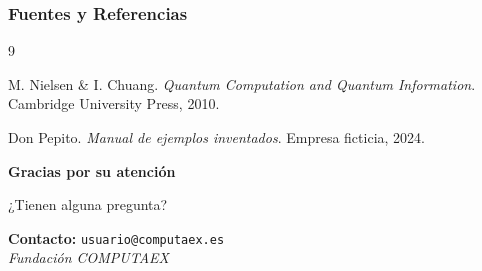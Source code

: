 \documentclass[aspectratio=169]{beamer} %
\begin{document}
\begin{frame}[allowframebreaks] %
\frametitle{Fuentes y Referencias}
\begin{thebibliography}{9}

    M. Nielsen \& I. Chuang.
    \textit{Quantum Computation and Quantum Information}.
    Cambridge University Press, 2010.

    Don Pepito.
    \textit{Manual de ejemplos inventados}.
    Empresa ficticia, 2024.
\end{thebibliography}
\end{frame}
\begin{frame}
\begin{center}
    \Huge \textcolor{MiColor}{\textbf{Gracias por su atención}}
    
    \vspace{1cm}
    \large ¿Tienen alguna pregunta?
    
    \vspace{1.5cm}
    \small \textbf{Contacto:} \texttt{usuario@computaex.es} \\
    \textit{Fundación COMPUTAEX}
\end{center}
\end{frame}
\end{document}

